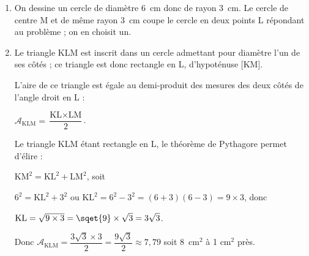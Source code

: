 \documentclass[10pt]{article}
\begin{document}
\setlength\parindent{0mm}
\pagestyle{fancy}
\thispagestyle{empty}
    
    
    




\medskip

%
%

\begin{enumerate}
\item %
On dessine un cercle de diamètre 6~cm donc de rayon 3~cm. Le cercle de centre M et de même rayon 3~cm coupe le cercle en deux points L répondant au problème ; on en choisit un.
\item %
Le triangle KLM est inscrit dans un cercle admettant pour diamètre l'un de ses côtés ; ce triangle est donc rectangle en L, d'hypoténuse [KM].

L'aire de ce triangle est égale au demi-produit des mesures des deux côtés de l'angle droit en L :

$\mathcal{A}_{\text{KLM}} = \dfrac{\text{KL} \times \text{LM} }{2}$.

Le triangle KLM étant rectangle en L, le théorème de Pythagore permet d'élire :

$\text{KM}^2 = \text{KL}^2 + \text{LM}^2$, soit 

$6^2 = \text{KL}^2 + 3^2$ ou $\text{KL}^2 = 6^2 - 3^2 = (6 + 3)(6 - 3) = 9 \times 3$, donc 

$\text{KL} = \sqrt{9 \times 3} = \sqet{9} \times \sqrt{3} = 3\sqrt{3}$.

Donc $\mathcal{A}_{\text{KLM}} = \dfrac{3\sqrt{3} \times 3 }{2} = \dfrac{9\sqrt{3}}{2} \approx 7,79$ soit 8~cm$^2$ à 1 cm$^2$ près.
\end{enumerate}

\vspace{0,5cm}
\end{document}
